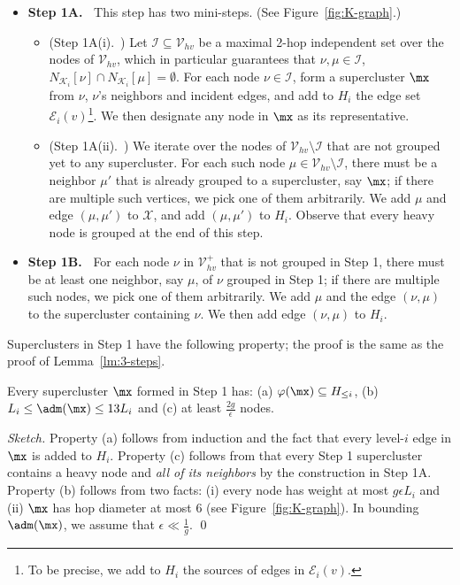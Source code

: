 \begin{itemize}
	\item \textbf{Step 1A.~} This step has two mini-steps. (See Figure~\ref{fig:K-graph}.)
	
	\begin{itemize}
		\item (Step 1A(i).~)  Let $\mathcal{I}\subseteq \mathcal{V}_{hv}$ be a maximal 2-hop independent set over the nodes of $\mathcal{V}_{hv}$, which in particular guarantees that $\nu,\mu \in \mathcal{I}$, $N_{\mathcal{K}_i}[\nu] \cap N_{\mathcal{K}_i}[\mu] = \emptyset$.  For each node $\nu \in \mathcal{I}$, form a supercluster $\mx$ from $\nu$, $\nu$'s neighbors and incident edges, and add to $H_i$ the edge set $\mathcal{E}_i(v)$\footnote{To be precise, we add to $H_i$ the sources of edges in $\mathcal{E}_i(v)$.}. We then designate any node in $\mx$ as its representative.
		\item (Step 1A(ii).~) We iterate over the nodes of $\mathcal{V}_{hv}\setminus \mathcal{I}$ that are not grouped yet to any supercluster. For each such node  $\mu \in \mathcal{V}_{hv}\setminus \mathcal{I}$, there must be a neighbor $\mu'$ that is already grouped to a supercluster, say $\mx$; if there are multiple such vertices, we pick one of them arbitrarily. We add $\mu$ and edge $(\mu,\mu')$ to $\mathcal{X}$, and add $(\mu,\mu')$ to $H_i$. Observe that every heavy node is grouped at the end of this step.
	\end{itemize}
	
	\item  \textbf{Step 1B.~} For each node $\nu$ in $\mathcal{V}^+_{hv}$ that is not grouped in Step 1, there must be at least one neighbor, say $\mu$, of $\nu$ grouped in Step 1; if there are multiple such nodes, we pick one of them arbitrarily. We add $\mu$ and the edge $(\nu,\mu)$ to the supercluster containing $\nu$. We then add edge $(\nu,\mu)$ to $H_i$.
\end{itemize}


\noindent Superclusters in Step 1 have the following property; the proof is the same as the proof of Lemma~\ref{lm:3-steps}.


\begin{lemma}\label{lm:Step1-Diam-Oracle} Every supercluster  $\mx$ formed  in Step 1   has: (a) $\varphi(\mx)\subseteq H_{\leq i}$, (b) $L_{i}\leq \adm(\mx)\leq 13L_{i}$  and (c) at least $\frac{2g}{\epsilon} $ nodes.
\end{lemma}
\begin{proof}[Sketch] Property (a) follows from induction and the fact that  every level-$i$ edge in $\mx$ is added to $H_i$. Property (c) follows from that every Step 1 supercluster contains a heavy node and \emph{all of its neighbors} by the construction in Step 1A. Property (b) follows from two facts: (i) every node has weight at most $g\epsilon L_i$  and (ii) $\mx$ has hop diameter at most $6$ (see Figure~\ref{fig:K-graph}).  In bounding $\adm(\mx)$, we assume that $\epsilon \ll \frac{1}{g}$. \qed
\end{proof}

